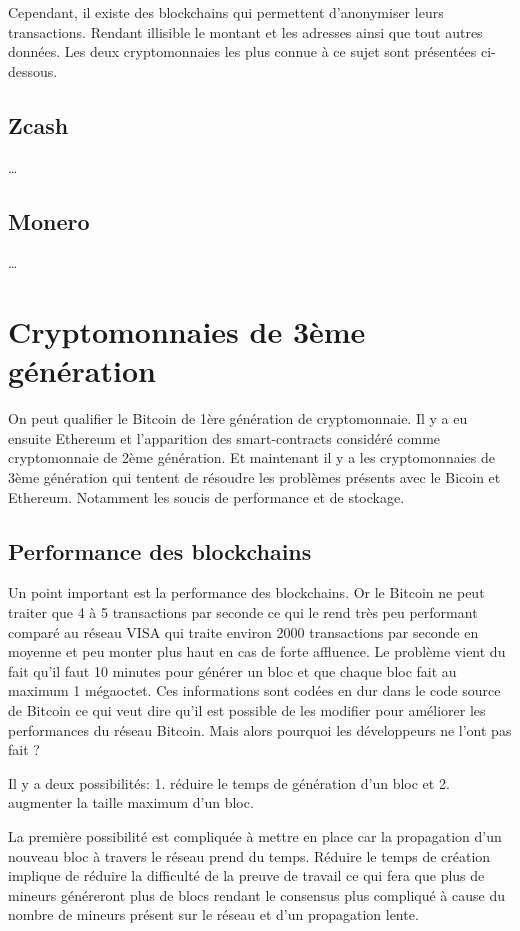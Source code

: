 \documentclass[../tb_report.tex]{subfiles}
\begin{document}
Cependant, il existe des blockchains qui permettent d'anonymiser leurs transactions. Rendant illisible le montant et les adresses ainsi que tout autres données. Les deux cryptomonnaies les plus connue à ce sujet sont présentées ci-dessous. 

\subsection{Zcash}

\dots

\subsection{Monero}

\dots

\section{Cryptomonnaies de 3ème génération}

On peut qualifier le Bitcoin de 1ère génération de cryptomonnaie. Il y a eu ensuite Ethereum et l'apparition des smart-contracts considéré comme cryptomonnaie de 2ème génération. Et maintenant il y a les cryptomonnaies de 3ème génération qui tentent de résoudre les problèmes présents avec le Bicoin et Ethereum. Notamment les soucis de performance et de stockage.

\subsection{Performance des blockchains}

Un point important est la performance des blockchains. Or le Bitcoin ne peut traiter que 4 à 5 transactions par seconde ce qui le rend très peu performant comparé au réseau VISA qui traite environ 2000 transactions par seconde en moyenne et peu monter plus haut en cas de forte affluence. Le problème vient du fait qu'il faut 10 minutes pour générer un bloc et que chaque bloc fait au maximum 1 mégaoctet. Ces informations sont codées en dur dans le code source de Bitcoin ce qui veut dire qu'il est possible de les modifier pour améliorer les performances du réseau Bitcoin. Mais alors pourquoi les développeurs ne l'ont pas fait ? 

Il y a deux possibilités: 1. réduire le temps de génération d'un bloc et 2. augmenter la taille maximum d'un bloc. 

La première possibilité est compliquée à mettre en place car la propagation d'un nouveau bloc à travers le réseau prend du temps. Réduire le temps de création implique de réduire la difficulté de la preuve de travail ce qui fera que plus de mineurs généreront plus de blocs rendant le consensus plus compliqué à cause du nombre de mineurs présent sur le réseau et d'un propagation lente.
\end{document}
